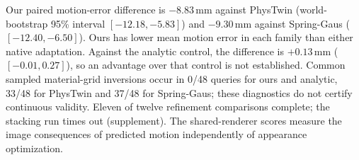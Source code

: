 Our paired motion-error difference is $-8.83$\,mm against PhysTwin
(world-bootstrap 95\% interval $[-12.18,-5.83]$) and $-9.30$\,mm
against Spring-Gaus ($[-12.40,-6.50]$). Ours has lower mean motion
error in each family than either native adaptation. Against the analytic
control, the difference is $+0.13$\,mm ($[-0.01,0.27]$), so an
advantage over that control is not established. Common sampled material-grid
inversions occur in 0/48 queries for ours and analytic, 33/48 for PhysTwin
and 37/48 for Spring-Gaus; these diagnostics do not certify continuous
validity. Eleven of twelve refinement comparisons complete;
the stacking run times out (supplement). The shared-renderer scores measure the image consequences of
predicted motion independently of appearance optimization.
